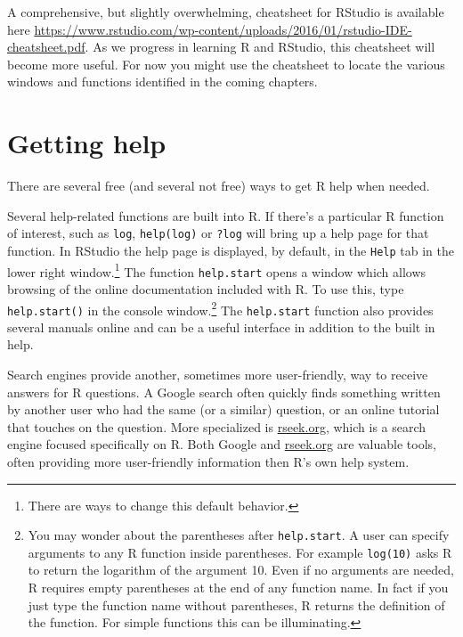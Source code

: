 \documentclass[12pt,oneside]{book}\usepackage[]{graphicx}\usepackage[]{color}
\begin{document}
A comprehensive, but slightly overwhelming, cheatsheet for RStudio is available here \url{https://www.rstudio.com/wp-content/uploads/2016/01/rstudio-IDE-cheatsheet.pdf}. As we progress in learning R and RStudio, this cheatsheet will become more useful. For now you might use the cheatsheet to locate the various windows and functions identified in the coming chapters.


\section{Getting help}
There are several free (and several not free) ways to get R help when needed. 

Several help-related functions are built into R. If there's a particular R function of interest, such as \verb+log+, \verb+help(log)+ or \texttt{?log} will bring up a help page for that function. In RStudio the help page is displayed, by default, in the \texttt{Help} tab in the lower right window.\footnote{There are ways to change this default behavior.} The function \verb+help.start+ opens a window which allows browsing of the online documentation included with R. To use this, type \verb+help.start()+ in the console window.\footnote{You may wonder about the parentheses after \texttt{help.start}. A user can specify arguments to any R function inside parentheses. For example \texttt{log(10)} asks R to return the logarithm of the argument 10. Even if no arguments are needed, R requires empty parentheses at the end of any function name. In fact if you just type the function name without parentheses, R returns the definition of the function. For simple functions this can be illuminating.} The \verb+help.start+ function also provides several manuals online and can be a useful interface in addition to the built in help.

Search engines provide another, sometimes more user-friendly, way to receive answers for R questions. A Google search often quickly finds something written by another user who had the same (or a similar) question, or an online tutorial that touches on the question. More specialized is \url{rseek.org}, which is a search engine focused specifically on R. Both Google and \url{rseek.org} are valuable tools, often providing more user-friendly information then R's own help system.
\end{document}
